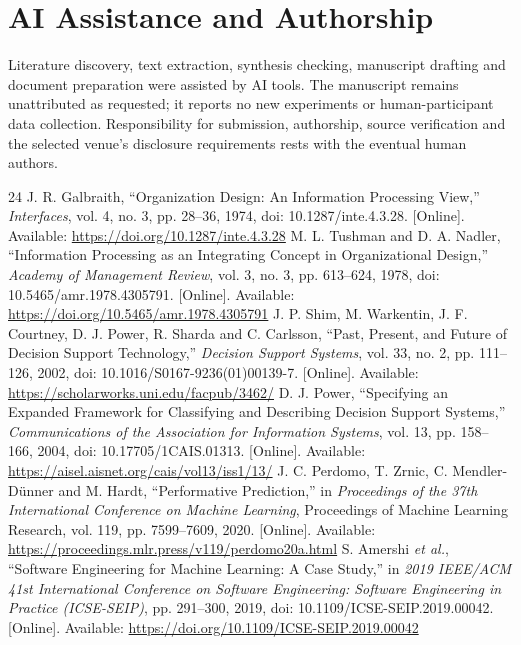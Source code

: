 \documentclass[journal]{IEEEtran}
\begin{document}
\section*{AI Assistance and Authorship}
Literature discovery, text extraction, synthesis checking, manuscript drafting and document preparation were assisted by AI tools. The manuscript remains unattributed as requested; it reports no new experiments or human-participant data collection. Responsibility for submission, authorship, source verification and the selected venue's disclosure requirements rests with the eventual human authors.

\begin{thebibliography}{24}
 J. R. Galbraith, ``Organization Design: An Information Processing View,'' \emph{Interfaces}, vol. 4, no. 3, pp. 28--36, 1974, doi: 10.1287/inte.4.3.28. [Online]. Available: \url{https://doi.org/10.1287/inte.4.3.28}
 M. L. Tushman and D. A. Nadler, ``Information Processing as an Integrating Concept in Organizational Design,'' \emph{Academy of Management Review}, vol. 3, no. 3, pp. 613--624, 1978, doi: 10.5465/amr.1978.4305791. [Online]. Available: \url{https://doi.org/10.5465/amr.1978.4305791}
 J. P. Shim, M. Warkentin, J. F. Courtney, D. J. Power, R. Sharda and C. Carlsson, ``Past, Present, and Future of Decision Support Technology,'' \emph{Decision Support Systems}, vol. 33, no. 2, pp. 111--126, 2002, doi: 10.1016/S0167-9236(01)00139-7. [Online]. Available: \url{https://scholarworks.uni.edu/facpub/3462/}
 D. J. Power, ``Specifying an Expanded Framework for Classifying and Describing Decision Support Systems,'' \emph{Communications of the Association for Information Systems}, vol. 13, pp. 158--166, 2004, doi: 10.17705/1CAIS.01313. [Online]. Available: \url{https://aisel.aisnet.org/cais/vol13/iss1/13/}
 J. C. Perdomo, T. Zrnic, C. Mendler-D\"{u}nner and M. Hardt, ``Performative Prediction,'' in \emph{Proceedings of the 37th International Conference on Machine Learning}, Proceedings of Machine Learning Research, vol. 119, pp. 7599--7609, 2020. [Online]. Available: \url{https://proceedings.mlr.press/v119/perdomo20a.html}
 S. Amershi \emph{et al.}, ``Software Engineering for Machine Learning: A Case Study,'' in \emph{2019 IEEE/ACM 41st International Conference on Software Engineering: Software Engineering in Practice (ICSE-SEIP)}, pp. 291--300, 2019, doi: 10.1109/ICSE-SEIP.2019.00042. [Online]. Available: \url{https://doi.org/10.1109/ICSE-SEIP.2019.00042}

\end{thebibliography}
\end{document}
